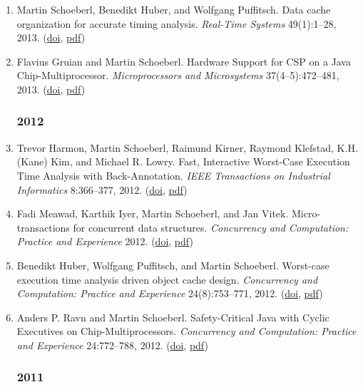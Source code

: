 \begin{enumerate}
\item Martin Schoeberl, Benedikt Huber, and Wolfgang Puffitsch.
 Data cache organization for accurate timing analysis.
 \emph{Real-Time Systems} 49(1):1--28, 2013.
(\href{http://dx.doi.org/10.1007/s11241-012-9159-8}{doi}, \href{http://www.jopdesign.com/doc/dcache_wcet.pdf}{pdf})

\item Flavius Gruian and Martin Schoeberl.
 Hardware Support for CSP on a Java Chip-Multiprocessor.
 \emph{Microprocessors and Microsystems} 37(4--5):472--481, 2013.
(\href{http://dx.doi.org/10.1016/j.micpro.2012.08.004}{doi}, \href{http://www.jopdesign.com/doc/csp_jop_micpro.pdf}{pdf})


\subsubsection*{2012}

\item Trevor Harmon, Martin Schoeberl, Raimund Kirner, Raymond Klefstad, K.H. (Kane) Kim, and Michael R. Lowry.
 Fast, Interactive Worst-Case Execution Time Analysis with Back-Annotation.
 \emph{IEEE Transactions on Industrial Informatics} 8:366--377, 2012.
(\href{http://dx.doi.org/10.1109/TII.2012.2187457}{doi}, \href{http://www.jopdesign.com/doc/intwcet.pdf}{pdf})

\item Fadi Meawad, Karthik Iyer, Martin Schoeberl, and Jan Vitek.
 Micro-transactions for concurrent data structures.
 \emph{Concurrency and Computation: Practice and Experience} 2012.
(\href{http://dx.doi.org/10.1002/cpe.2985}{doi}, \href{http://www.jopdesign.com/doc/utran_cpe.pdf}{pdf})

\item Benedikt Huber, Wolfgang Puffitsch, and Martin Schoeberl.
 Worst-case execution time analysis driven object cache design.
 \emph{Concurrency and Computation: Practice and Experience} 24(8):753--771, 2012.
(\href{http://dx.doi.org/10.1002/cpe.1763}{doi}, \href{http://www.jopdesign.com/doc/ocwcet_ccpe.pdf}{pdf})

\item Anders P. Ravn and Martin Schoeberl.
 Safety-Critical Java with Cyclic Executives on Chip-Multiprocessors.
 \emph{Concurrency and Computation: Practice and Experience} 24:772--788, 2012.
(\href{http://dx.doi.org/10.1002/cpe.1754}{doi}, \href{http://www.jopdesign.com/doc/scj0cmp.pdf}{pdf})


\subsubsection*{2011}


\end{enumerate}
